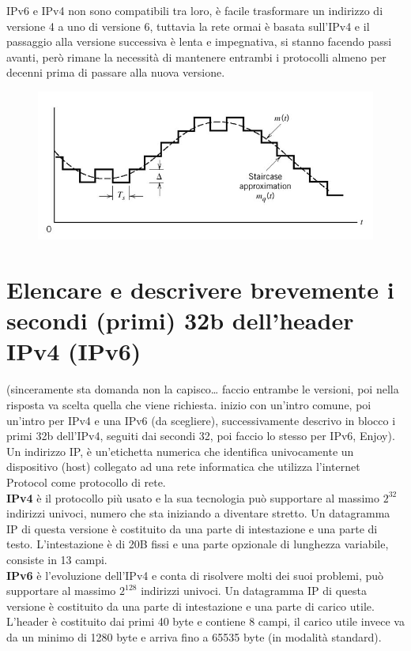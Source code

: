 IPv6 e IPv4 non sono compatibili tra loro, è facile trasformare un indirizzo di versione 4 a uno di versione 6, tuttavia la rete ormai è basata sull’IPv4 e il passaggio alla versione successiva è lenta e impegnativa, si stanno facendo passi avanti, però rimane la necessità di mantenere entrambi i protocolli almeno per decenni prima di passare alla nuova versione.

\begin{figure}[H]
\centering
\includegraphics[scale=0.6]{res/img/6_modulazioneDelta.png}
\end{figure}

\section{Elencare e descrivere brevemente i secondi (primi) 32b dell'header IPv4 (IPv6)}
(sinceramente sta domanda non la capisco… faccio entrambe le versioni, poi nella risposta va scelta quella che viene richiesta. inizio con un’intro comune, poi un’intro per IPv4 e una IPv6 (da scegliere), successivamente descrivo in blocco i primi 32b dell’IPv4, seguiti dai secondi 32, poi faccio lo stesso per IPv6, Enjoy).\\

Un indirizzo IP, è un’etichetta numerica che identifica univocamente un dispositivo (host) collegato ad una rete informatica che utilizza l’internet Protocol come protocollo di rete.\\
\textbf{IPv4} è il protocollo più usato e la sua tecnologia può supportare al massimo $2^32$ indirizzi univoci, numero che sta iniziando a diventare stretto.
Un datagramma IP di questa versione è costituito da una parte di intestazione e una parte di testo. L’intestazione è di 20B fissi e una parte opzionale di lunghezza variabile, consiste in 13 campi.\\
\textbf{IPv6} è l’evoluzione dell’IPv4 e conta di risolvere molti dei suoi problemi, può supportare al massimo $2^128$ indirizzi univoci.
Un datagramma IP di questa versione è costituito da una parte di intestazione e una parte di carico utile. L’header è costituito dai primi 40 byte e contiene 8 campi, il carico utile invece va da un minimo di 1280 byte e arriva fino a 65535 byte (in modalità standard).

